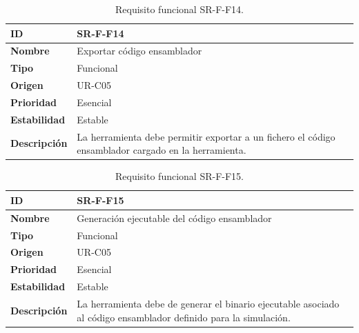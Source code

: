 \begin{center}
\begin{table}[htbp]
\centering
\caption{Requisito funcional SR-F-F14.}
\begin{tabular}{@{}p{2.5cm} p{9cm}@{}} 
\toprule
\textbf{ID} 				& SR-F-F14 \\
\midrule
\textbf{Nombre} 			& Exportar código \gls{ensamblador}\\
\midrule
\textbf{Tipo} 			& Funcional \\
\midrule
\textbf{Origen} 			& UR-C05 \\
\midrule
\textbf{Prioridad}		& Esencial \\
\midrule
\textbf{Estabilidad} 		& Estable \\
\midrule
\textbf{Descripción} 	& La herramienta debe permitir exportar a un fichero el código \gls{ensamblador} cargado en la herramienta. \\
\bottomrule
\end{tabular}
\label{tab:srff14}
\end{table}
\end{center}

\begin{center}
\begin{table}[htbp]
\centering
\caption{Requisito funcional SR-F-F15.}
\begin{tabular}{@{}p{2.5cm} p{9cm}@{}} 
\toprule
\textbf{ID} 				& SR-F-F15 \\
\midrule
\textbf{Nombre} 			& Generación ejecutable del código \gls{ensamblador}\\
\midrule
\textbf{Tipo} 			& Funcional \\
\midrule
\textbf{Origen} 			& UR-C05 \\
\midrule
\textbf{Prioridad}		& Esencial \\
\midrule
\textbf{Estabilidad} 		& Estable \\
\midrule
\textbf{Descripción} 	& La herramienta debe de generar el binario ejecutable asociado al código \gls{ensamblador} definido para la simulación. \\
\bottomrule
\end{tabular}
\label{tab:srff15}
\end{table}
\end{center}


